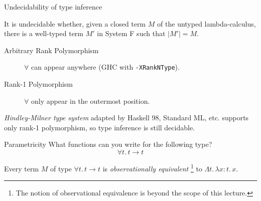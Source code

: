 \begin{frame}{Undecidability of type inference}
  \begin{theorem}
     It is undecidable whether, given a closed term $M$ of the untyped
     lambda-calculus, there is a well-typed term $M'$ in System F such that
     $|M'| = M$.  
  \end{theorem}

  \begin{description}
    \item[Arbitrary Rank Polymorphism] $\forall$ can appear
      anywhere {\small (GHC with \texttt{-XRankNType})}. 
    \item[Rank-1 Polymorphism]
      $\forall$ only appear in the outermost position.
  \end{description}
  \emph{Hindley-Milner type system} adapted by Haskell 98, Standard ML, etc.
  supports only rank-1 polymorphism, so type inference is still decidable.
\end{frame}

\begin{frame}{Parametricity}
  What functions can you write for the following type?
  \[
    \forall t.\,t \to t 
  \]
  \begin{theorem}
    Every term $M$ of type $\forall t.\, t \to t$ is \emph{observationally equivalent}%
    \footnote{The notion of observational equivalence is beyond the scope of this lecture.}
      to $\Lambda t.\, \lambda x : t.\, x$. 
  \end{theorem}
\end{frame}

